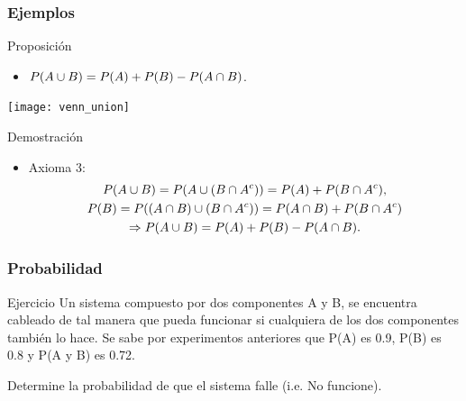 \documentclass[table]{beamer}
\begin{document}
\begin{frame}
    \frametitle{Ejemplos}
    \begin{block}{Proposición}
        \begin{itemize}
            \item $\prob{A \cup B} = \prob{A} + \prob{B} - \prob{A \cap B}$.
        \end{itemize}
    \end{block}
    \begin{center}
        \texttt{[image: venn\_union]}
    \end{center}
    \begin{block}{Demostración}
        \begin{itemize}
            \item Axioma 3:
                \begin{multline*}
                    \prob{A \cup B} = \prob{A \cup \parens{B \cap A^{c}}} = \prob{A} + \prob{B \cap A^{c}} ,
                    \\
                    \prob{B} = \prob{\parens{A \cap B} \cup \parens{B \cap A^{c}}} = \prob{A \cap B} + \prob{B \cap A^{c}}
                    \\
                    \Rightarrow \prob{A \cup B} = \prob{A} + \prob{B} - \prob{A \cap B} .
                \end{multline*}
        \end{itemize}
    \end{block}
\end{frame}




\begin{frame}
    \frametitle{Probabilidad}

    \begin{block}{Ejercicio}
Un sistema compuesto por dos componentes A y B, se encuentra cableado de tal manera que pueda funcionar si cualquiera de los dos componentes también lo hace.
Se sabe por experimentos anteriores que P(A) es 0.9, P(B) es 0.8 y P(A y B) es 0.72.


Determine la probabilidad de que el sistema falle (i.e. No funcione).

\end{block}

\end{frame}

\end{document}
